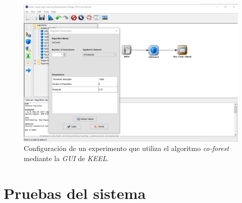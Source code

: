 \begin{figure}[h]
	\caption{Configuración de un experimento que utiliza el algoritmo \textit{co-forest} mediante la \textit{GUI} de \textit{KEEL}.}
	\centering
	\includegraphics[width=\textwidth]{../img/anexos/manual/keel_gui.png}
\end{figure}


\section{Pruebas del sistema}
